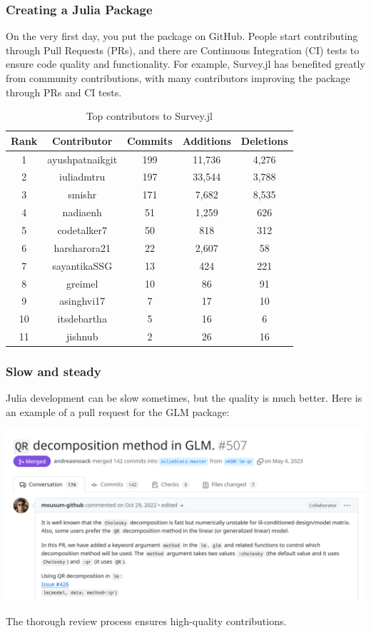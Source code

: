 \documentclass[aspectratio=169]{beamer} %
\begin{document}
\begin{frame}
  \frametitle{Creating a Julia Package}

  On the very first day, you put the package on GitHub. People start contributing through Pull Requests (PRs), and there are Continuous Integration (CI) tests to ensure code quality and functionality. For example, Survey.jl has benefited greatly from community contributions, with many contributors improving the package through PRs and CI tests.

  \begin{table}[]
    \centering
    \scriptsize
    \begin{tabular}{|c|c|c|c|c|}
      \hline
      \textbf{Rank} & \textbf{Contributor} & \textbf{Commits} & \textbf{Additions} & \textbf{Deletions} \\ \hline
      1 & ayushpatnaikgit & 199 & 11,736 & 4,276 \\ \hline
      2 & iuliadmtru & 197 & 33,544 & 3,788 \\ \hline
      3 & smishr & 171 & 7,682 & 8,535 \\ \hline
      4 & nadiaenh & 51 & 1,259 & 626 \\ \hline
      5 & codetalker7 & 50 & 818 & 312 \\ \hline
      6 & harsharora21 & 22 & 2,607 & 58 \\ \hline
      7 & sayantikaSSG & 13 & 424 & 221 \\ \hline
      8 & greimel & 10 & 86 & 91 \\ \hline
      9 & asinghvi17 & 7 & 17 & 10 \\ \hline
      10 & itsdebartha & 5 & 16 & 6 \\ \hline
      11 & jishnub & 2 & 26 & 16 \\ \hline
    \end{tabular}
    \caption{Top contributors to Survey.jl}
  \end{table}

\end{frame}


\begin{frame}
  \frametitle{Slow and steady}

  Julia development can be slow sometimes, but the quality is much better. Here is an example of a pull request for the GLM package:

  \begin{center}
    \includegraphics[width=0.7\linewidth]{GLM_PR.png}
  \end{center}

  \vfill
  \footnotesize
 
  The thorough review process ensures high-quality contributions.
\end{frame}
\end{document}
